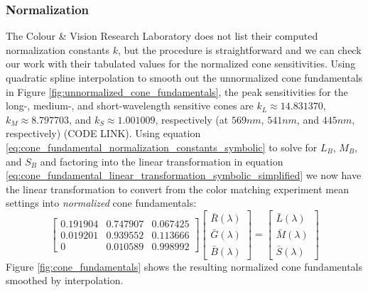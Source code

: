 \documentclass[twocolumn]{article}
\newif\ifinvert
\begin{document}
\subsubsection{Normalization}
The Colour \& Vision Research Laboratory does not list their computed normalization constants $k$, but the procedure is straightforward and we can check our work with their tabulated values for the normalized cone sensitivities.  Using quadratic spline interpolation to smooth out the unnormalized cone fundamentals in Figure \ref{fig:unnormalized_cone_fundamentals}, the peak sensitivities for the long-, medium-, and short-wavelength sensitive cones are $k_L\approx14.831370$, $k_M\approx8.797703$, and $k_S\approx1.001009$, respectively (at $569 nm$, $541 nm$, and $445 nm$, respectively) (CODE LINK).  Using equation \ref{eq:cone_fundamental_normalization_constants_symbolic} to solve for $L_B$, $M_B$, and $S_B$ and factoring into the linear transformation in equation \ref{eq:cone_fundamental_linear_transformation_symbolic_simplified} we now have the linear transformation to convert from the color matching experiment mean settings into \textit{normalized} cone fundamentals:
\begin{equation}
    \begin{bmatrix}
        0.191904&0.747907&0.067425\\
        0.019201&0.939552&0.113666\\
        0&0.010589&0.998992
    \end{bmatrix}\begin{bmatrix}
        \bar{R}(\lambda)\\
        \bar{G}(\lambda)\\
        \bar{B}(\lambda)
    \end{bmatrix}=\begin{bmatrix}
        \bar{L}(\lambda)\\
        \bar{M}(\lambda)\\
        \bar{S}(\lambda)
    \end{bmatrix}
\end{equation}
Figure \ref{fig:cone_fundamentals} shows the resulting normalized cone fundamentals smoothed by interpolation.
\begin{figure*}[h]
    \ifinvert
        
    \else
        
    \fi
    \caption{Normalized, smoothed cone fundamentals.  The approximate peak of each cone's sensitivity curve is annotated.  IMAGE LINK, CODE LINK}\label{fig:cone_fundamentals}
\end{figure*}
\end{document}
